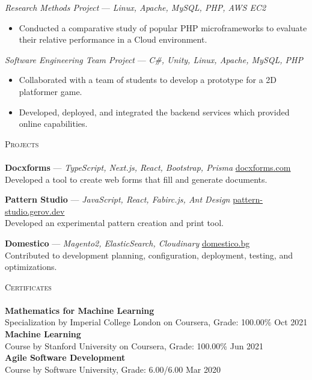 \documentclass[a4paper]{article}
\newcommand{\lineunder} {
    \vspace*{-8pt} \\
    \hspace*{-18pt} \hrulefill \\
}
\newcommand{\header} [1] {
    {\hspace*{-18pt}\vspace*{6pt} \textsc{#1}}
    \vspace*{-6pt} \lineunder
}
\begin{document}
{\textit{Research Methods Project}} — {\sl Linux, Apache, MySQL, PHP, AWS EC2 }\
\vspace{-1mm}
\begin{itemize} \itemsep 1pt
    \item Conducted a comparative study of popular PHP microframeworks to evaluate their relative performance in a Cloud environment.
\end{itemize}

{\textit{Software Engineering Team Project}} — {\sl C\#, Unity, Linux, Apache, MySQL, PHP}\
\vspace{-1mm}
\begin{itemize} \itemsep 1pt
    \item Collaborated with a team of students to develop a prototype for a 2D platformer game.
    \item Developed, deployed, and integrated the backend services which provided online capabilities.
\end{itemize}

\header{Projects}
{\textbf{Docxforms}} — {\sl TypeScript, Next.js, React, Bootstrap, Prisma} \hfill \href{https://docxforms.com/}{\underline{docxforms.com}}\\
Developed a tool to create web forms that fill and generate documents.
\vspace*{1mm}

{\textbf{Pattern Studio}} — {\sl JavaScript, React, Fabirc.js, Ant Design} \hfill \href{https://pattern-studio.gerov.dev/}{\underline{pattern-studio.gerov.dev}}\\
Developed an experimental pattern creation and print tool.
\vspace*{1mm}

{\textbf{Domestico}} — {\sl Magento2, ElasticSearch, Cloudinary} \hfill \href{https://domestico.bg/}{\underline{domestico.bg}}\\
Contributed to development planning, configuration, deployment, testing, and optimizations.
\vspace*{1mm}

\header{Certificates}
\textbf{Mathematics for Machine Learning}\\
Specialization by Imperial College London on Coursera, Grade: 100.00\% \hfill Oct 2021\\
\vspace*{1mm}
\textbf{Machine Learning}\\
Course by Stanford University on Coursera, Grade: 100.00\% \hfill Jun 2021\\
\vspace*{1mm}
\textbf{Agile Software Development}\\
Course by Software University, Grade: 6.00/6.00 \hfill Mar 2020\\
\vspace*{1mm}
\end{document}
